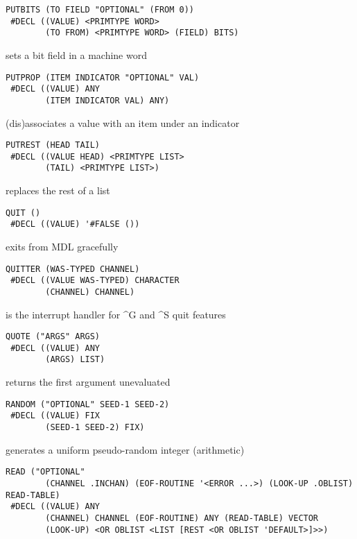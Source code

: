 \documentclass[a4paper,]{article}
\begin{document}
\begin{verbatim}
PUTBITS (TO FIELD "OPTIONAL" (FROM 0))
 #DECL ((VALUE) <PRIMTYPE WORD>
        (TO FROM) <PRIMTYPE WORD> (FIELD) BITS)
\end{verbatim}

sets a bit field in a machine word

\begin{verbatim}
PUTPROP (ITEM INDICATOR "OPTIONAL" VAL)
 #DECL ((VALUE) ANY
        (ITEM INDICATOR VAL) ANY)
\end{verbatim}

(dis)associates a value with an item under an indicator

\begin{verbatim}
PUTREST (HEAD TAIL)
 #DECL ((VALUE HEAD) <PRIMTYPE LIST>
        (TAIL) <PRIMTYPE LIST>)
\end{verbatim}

replaces the rest of a list

\begin{verbatim}
QUIT ()
 #DECL ((VALUE) '#FALSE ())
\end{verbatim}

exits from MDL gracefully

\begin{verbatim}
QUITTER (WAS-TYPED CHANNEL)
 #DECL ((VALUE WAS-TYPED) CHARACTER
        (CHANNEL) CHANNEL)
\end{verbatim}

is the interrupt handler for \^{}G and \^{}S quit features

\begin{verbatim}
QUOTE ("ARGS" ARGS)
 #DECL ((VALUE) ANY
        (ARGS) LIST)
\end{verbatim}

returns the first argument unevaluated

\begin{verbatim}
RANDOM ("OPTIONAL" SEED-1 SEED-2)
 #DECL ((VALUE) FIX
        (SEED-1 SEED-2) FIX)
\end{verbatim}

generates a uniform pseudo-random integer (arithmetic)

\begin{verbatim}
READ ("OPTIONAL"
        (CHANNEL .INCHAN) (EOF-ROUTINE '<ERROR ...>) (LOOK-UP .OBLIST) READ-TABLE)
 #DECL ((VALUE) ANY
        (CHANNEL) CHANNEL (EOF-ROUTINE) ANY (READ-TABLE) VECTOR
        (LOOK-UP) <OR OBLIST <LIST [REST <OR OBLIST 'DEFAULT>]>>)
\end{verbatim}
\end{document}
